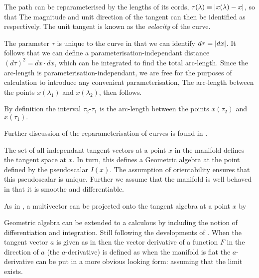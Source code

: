 The path can be reparameterised by the lengths of its cords,
$\tau(\lambda) \equiv \left| x(\lambda) - x \right|$,
so that
The magnitude and unit direction of the tangent can then be identified
as
respectively.
The unit tangent
is known as the {\em velocity} of the curve.



The parameter $\tau$ is unique to the curve in that we can identify $d\tau =\left| dx \right|$.
It follows that we can define a parameterisation-independant
distance $(d\tau)^2 = dx\cdot dx$, which can be integrated to find the
total arc-length.
Since the arc-length is 
parameterisation-independant, 
we are free for the purposes of calculation to introduce any
convenient  parameterisation,
The arc-length between the points $x(\lambda_1)$ and $x(\lambda_2)$, 
then follows.

By definition the interval $\tau_2$-$\tau_1$ is the arc-length between the points
$x(\tau_2)$ and $x(\tau_1).$

Further discussion of the reparameterisation of curves is found in
\cite{Struik1988}.

The set of all independant tangent vectors at a point $x$ in the
manifold defines the tangent space at $x$.
In turn, this defines a  Geometric algebra at the point defined
by the pseudoscalar $I(x)$.
The assumption of orientability ensures that this pseudoscalar is unique.
Further we assume that the manifold is well behaved in that it is
smoothe and differentiable.

As in , 
a multivector can be projected onto the tangent algebra at a point $x$
by

Geometric algebra can be extended to a calculous by including the notion
of differentiation and integration.
Still following the developments of  \cite{Hestenes1984}.
When the tangent vector $a$ is given as in  then the
vector derivative of a function $F$ in the direction of $a$ (the
$a$-derivative) is
defined as 
when the manifold is flat the $a$-derivative can be put in a more obvious
looking form:
assuming that the limit exists.

